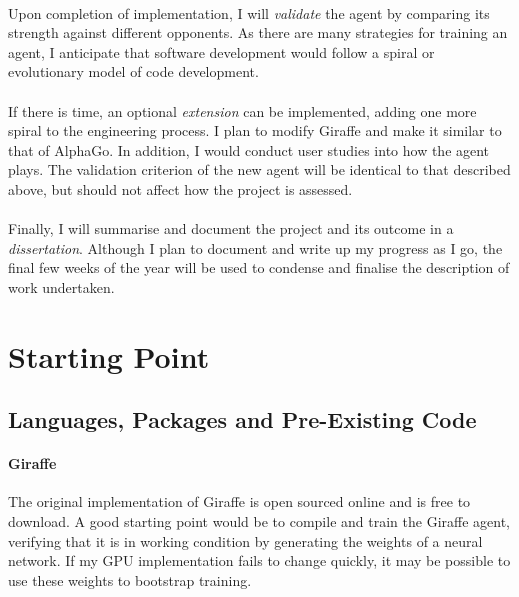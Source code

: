\documentclass[a4paper]{article}
\begin{document}
\paragraph{}Upon completion of implementation, I will \textit{validate} the agent by comparing its strength against different opponents. As there are many strategies for training an agent, I anticipate that software development would follow a spiral or evolutionary model of code development.

\paragraph{}If there is time, an optional \textit{extension} can be implemented, adding one more spiral to the engineering process. I plan to modify Giraffe and make it similar to that of AlphaGo. In addition, I would conduct user studies into how the agent plays. The validation criterion of the new agent will be identical to that described above, but should not affect how the project is assessed.

\paragraph{}Finally, I will summarise and document the project and its outcome in a \textit{dissertation}. Although I plan to document and write up my progress as I go, the final few weeks of the year will be used to condense and finalise the description of work undertaken.


\section*{Starting Point}

\subsection*{Languages, Packages and Pre-Existing Code}

\paragraph{Giraffe} The original implementation of Giraffe is open sourced online and is free to download. A good starting point would be to compile and train the Giraffe agent, verifying that it is in working condition by generating the weights of a neural network. If my GPU implementation fails to change quickly, it may be possible to use these weights to bootstrap training.
\end{document}
